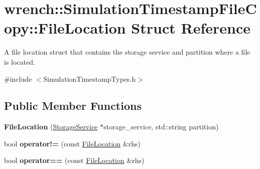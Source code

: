 \hypertarget{structwrench_1_1_simulation_timestamp_file_copy_1_1_file_location}{}\section{wrench\+:\+:Simulation\+Timestamp\+File\+Copy\+:\+:File\+Location Struct Reference}
\label{structwrench_1_1_simulation_timestamp_file_copy_1_1_file_location}


A file location struct that contains the storage service and partition where a file is located.  




{\ttfamily \#include $<$Simulation\+Timestamp\+Types.\+h$>$}

\subsection*{Public Member Functions}
\begin{DoxyCompactItemize}
\item 
\mbox{\label{structwrench_1_1_simulation_timestamp_file_copy_1_1_file_location_ae7c84b7e0d04c47b45b73a1c606388cf}} 
{\bfseries File\+Location} (\hyperlink{classwrench_1_1_storage_service}{Storage\+Service} $\ast$storage\+\_\+service, std\+::string partition)
\item 
\mbox{\label{structwrench_1_1_simulation_timestamp_file_copy_1_1_file_location_aeba929897e5efd58f2912f4ed41e19cd}} 
bool {\bfseries operator!=} (const \hyperlink{structwrench_1_1_simulation_timestamp_file_copy_1_1_file_location}{File\+Location} \&rhs)
\item 
\mbox{\label{structwrench_1_1_simulation_timestamp_file_copy_1_1_file_location_a3dff7db2ffe47741dfd8e5b3ea39c51d}} 
bool {\bfseries operator==} (const \hyperlink{structwrench_1_1_simulation_timestamp_file_copy_1_1_file_location}{File\+Location} \&rhs)
\end{DoxyCompactItemize}
